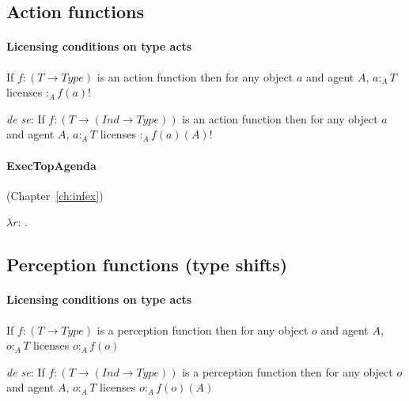 
\subsection{Action functions}
\label{app:actfuns}

\paragraph{Licensing conditions on type acts}  

If
$f:(T\rightarrow\textit{Type})$ is an action function then for any
object $a$ and agent $A$, $a:_A T$ licenses $:_A f(a)!$

\textit{de se}: If
$f:(T\rightarrow(\textit{Ind}\rightarrow\textit{Type}))$ is an action function then for any
object $a$ and agent $A$, $a:_A T$ licenses $:_A f(a)(A)!$


\paragraph{ExecTopAgenda} (Chapter~\ref{ch:infex})

$\lambda
r$: \hspace*{.5em}.
\\
\hspace*{2em} 

\subsection{Perception functions (type shifts)}

\paragraph{Licensing conditions on type acts}

If
$f:(T\rightarrow\textit{Type})$ is a perception function then for any
object $o$ and agent $A$, $o:_A T$ licenses $o:_A f(o)$

\textit{de se}: If
$f:(T\rightarrow(\textit{Ind}\rightarrow\textit{Type}))$ is a perception function then for any
object $o$ and agent $A$, $o:_A T$ licenses $o:_A f(o)(A)$

